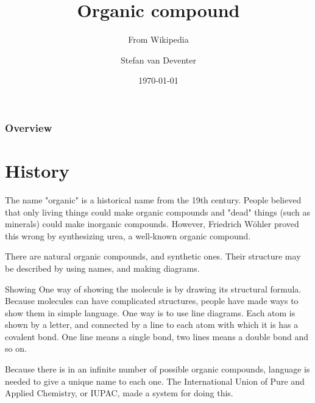 \documentclass{beamer}
\title{Organic compound}
\subtitle{From Wikipedia}
\author{Stefan van Deventer}
\institute{University of Stellenbosch}
\date{\today}
\begin{document}
\begin{frame}
	\titlepage
\end{frame}

\begin{frame}
	\frametitle{Overview}
	\tableofcontents
\end{frame}


\section{History}
\begin{frame}
	The name "organic" is a historical name from the 19th century.
	\newline
	\newline
	People believed that only living things could make organic compounds and "dead" things (such as minerals) 
	could make inorganic compounds. However, Friedrich Wöhler proved this wrong by synthesizing urea, a well-known 
	organic compound.
\end{frame}
\begin{frame}
	There are natural organic compounds, and synthetic ones. Their structure may be described by using names, 
	and making diagrams.
	\begin{block}{Showing}
		One way of showing the molecule is by drawing its structural formula. Because molecules can have 
		complicated structures, people have made ways to show them in simple language. One way is to use line 
		diagrams. Each atom is shown by a letter, and connected by a line to each atom with which it is has a 
		covalent bond. One line means a single bond, two lines means a double bond and so on.
	\end{block}
	Because there is in an infinite number of possible organic compounds, language is needed to give a 
	unique name to each one. The International Union of Pure and Applied Chemistry, or IUPAC, made a system for 
	doing this.

	\end{frame}

\end{document}
